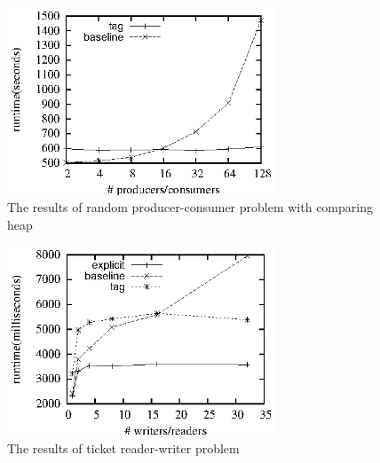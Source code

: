 \documentclass[preprint]{sigplanconf}
\begin{document}
\begin{figure}[ht!]
  \centering
  \includegraphics[width=80mm]{fig/rpch.eps}
  \caption{The results of random producer-consumer problem with comparing heap}
  \label{fig:rpc_eval}
\end{figure}

%
\begin{figure}[ht!]
  \centering
  \includegraphics[width=80mm]{fig/trw.eps}
  \caption{The results of ticket reader-writer problem}
  \label{fig:rw_eval}
\end{figure}
\end{document}
